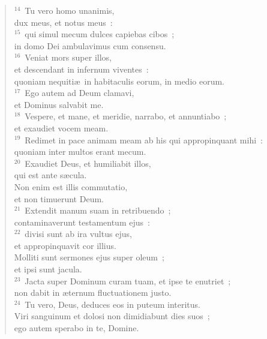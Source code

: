 \begin{flushleft}
\begin{verse}
${}^{14}$~Tu vero homo unanimis,\\ dux meus, et notus meus~:\\
${}^{15}$~qui simul mecum dulces capiebas cibos~;\\ in domo Dei ambulavimus cum consensu.\\
${}^{16}$~Veniat mors super illos,\\ et descendant in infernum viventes~:\\ quoniam nequiti\ae\ in habitaculis eorum, in medio eorum.\\
${}^{17}$~Ego autem ad Deum clamavi,\\ et Dominus salvabit me.\\
${}^{18}$~Vespere, et mane, et meridie, narrabo, et annuntiabo~;\\ et exaudiet vocem meam.\\
${}^{19}$~Redimet in pace animam meam ab his qui appropinquant mihi~:\\ quoniam inter multos erant mecum.\\
${}^{20}$~Exaudiet Deus, et humiliabit illos,\\ qui est ante s\ae cula.\\ Non enim est illis commutatio,\\ et non timuerunt Deum.\\
${}^{21}$~Extendit manum suam in retribuendo~;\\ contaminaverunt testamentum ejus~:\\
${}^{22}$~divisi sunt ab ira vultus ejus,\\ et appropinquavit cor illius.\\ Molliti sunt sermones ejus super oleum~;\\ et ipsi sunt jacula.\\
${}^{23}$~Jacta super Dominum curam tuam, et ipse te enutriet~;\\ non dabit in \ae ternum fluctuationem justo.\\
${}^{24}$~Tu vero, Deus, deduces eos in puteum interitus.\\ Viri sanguinum et dolosi non dimidiabunt dies suos~;\\ ego autem sperabo in te, Domine.\end{verse}\end{flushleft}


